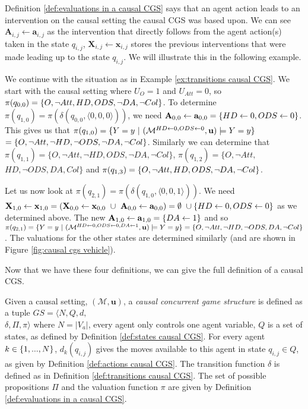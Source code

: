 Definition \ref{def:evaluations in a causal CGS} says that an agent action leads to an intervention on the causal setting the causal CGS was based upon. 
We can see $\mathbf{A}_{i,j} \leftarrow \mathbf{a}_{i,j}$ as the intervention that directly follows from the agent action(s) taken in the state $q_{i,j}$, $\mathbf{X}_{i,j} \leftarrow \mathbf{x}_{i,j}$ stores the previous interventions that were made leading up to the state $q_{i,j}$.
We will illustrate this in the following example.
\begin{example}\label{ex:evaluations CGS}
    We continue with the situation as in Example \ref{ex:transitions causal CGS}. 
    We start with the causal setting where $U_O = 1$ and $U_{Att} = 0$, so $\pi(q_{0,0}) = \{ {O, \neg Att, HD, ODS, \neg DA, \neg Col} \}$.
    To determine $\pi(q_{1,0}) = \pi(\delta(q_{0,0}, \langle 0,0,0 \rangle ))$, we need $\mathbf{A}_{0,0} \leftarrow \mathbf{a}_{0,0} = \{ {HD \leftarrow 0, ODS \leftarrow 0} \}$. This gives us that $\pi(q_{1,0}) = \set{Y = y \ | \ \csettingint{HD \leftarrow 0, ODS \leftarrow 0} \models Y = y} $ $= \{ {O, \neg Att, \neg HD, \neg ODS, \neg DA, \neg Col} \}$.
    Similarly we can determine that $\pi(q_{1,1}) = \{O, \neg Att, \neg HD,  ODS, \neg DA, \neg Col\}$, $\pi(q_{1,2}) = \{O, \neg Att, $\\$ HD, \neg ODS, DA, Col\}$ and $\pi(q_{1,3}) = \{ {O, \neg Att, HD,  ODS, \neg DA, \neg Col} \}$.

    Let us now look at $\pi(q_{2,1}) = \pi(\delta(q_{1,0}, \langle 0,0,1\rangle))$.
    We need $\myvec{X}_{1,0} \leftarrow \myvec{x}_{1,0} = (\myvec{X}_{0,0} \leftarrow \myvec{x}_{0,0} \ \cup \ \myvec{A}_{0,0} \leftarrow \myvec{a}_{0,0}) =  \emptyset \ \cup \set{HD \leftarrow 0, ODS \leftarrow 0}$ as we determined above.
    The new $\mathbf{A}_{1,0} \leftarrow \mathbf{a}_{1,0} = \{ {DA \leftarrow 1} \}$ and so $\pi(q_{2,1}) = \{ {Y = y \ | \ (\mathcal{M}^{HD \leftarrow 0, ODS \leftarrow 0, DA \leftarrow 1},\mathbf{u}) \models Y = y } \} = \{O, \neg Att, \neg HD, \neg ODS, DA, \neg Col\}$.
    The valuations for the other states are determined similarly (and are shown in Figure \ref{fig:causal cgs vehicle}).

\end{example}

Now that we have these four definitions, we can give the full definition of a causal CGS.

\begin{definition}\label{def:causal CGS}
    Given a causal setting, $(\mathcal{M},\mathbf{u})$, a \emph{causal concurrent game structure} is defined as a tuple $GS = \langle N, Q, d,$\\$ \delta, \Pi, \pi\rangle$ where $N = |V_a|$, every agent only controls one agent variable, $Q$ is a set of states, as defined by Definition \ref{def:states causal CGS}. For every agent $k \in \{ {1,...,N} \}$, $d_k(q_{i,j})$ gives the moves available to this agent in state $q_{i,j} \in Q$, as given by Definition \ref{def:actions causal CGS}.
    The transition function $\delta$ is defined as in Definition \ref{def:transitions causal CGS}.
    The set of possible propositions $\Pi$ and the valuation function $\pi$ are given by Definition \ref{def:evaluations in a causal CGS}.
\end{definition}

